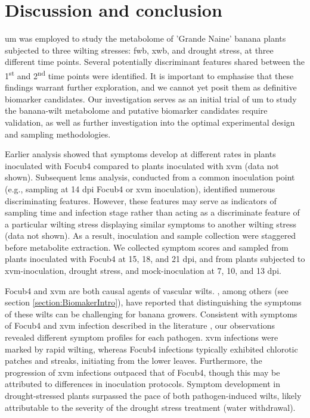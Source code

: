 \newpage
\section{Discussion and conclusion}

\Acf{um} was employed to study the metabolome of 'Grande Naine' banana plants subjected to three wilting stresses: \acf{fwb}, \acf{xwb}, and drought stress, at three different time points. Several potentially discriminant features shared between the 1\textsuperscript{st} and 2\textsuperscript{nd} time points were identified. It is important to emphasise that these findings warrant further exploration, and we cannot yet posit them as definitive biomarker candidates. Our investigation serves as an initial trial of \ac{um} to study the banana-wilt metabolome and putative biomarker candidates require validation, as well as further investigation into the optimal experimental design and sampling methodologies.

Earlier analysis showed that symptoms develop at different rates in plants inoculated with \ac{Focub4} compared to plants inoculated with \ac{xvm} (data not shown). Subsequent \ac{lcms} analysis, conducted from a common inoculation point (e.g., sampling at 14 \ac{dpi} \ac{Focub4} or \ac{xvm} inoculation), identified numerous discriminating features. However, these features may serve as indicators of sampling time and infection stage rather than acting as a discriminate feature of a particular wilting stress displaying similar symptoms to another wilting stress (data not shown). As a result, inoculation and sample collection were staggered before metabolite extraction. We collected symptom scores and sampled from plants inoculated with \ac{Focub4} at 15, 18, and 21 \ac{dpi}, and from plants subjected to \ac{xvm}-inoculation, drought stress, and mock-inoculation at 7, 10, and 13 \ac{dpi}.

\ac{Focub4} and \ac{xvm} are both causal agents of vascular wilts. \textcite{Biruma2007}, among others (see section \ref{section:BiomakerIntro}), have reported that distinguishing the symptoms of these wilts can be challenging for banana growers. Consistent with symptoms of \ac{Focub4} and \ac{xvm} infection described in the literature \parencite{Ploetz2015a, Garcia-Bastidas2019, Ordonez2015a, Ocimati2022, Tripathi2021}, our observations revealed different symptom profiles for each pathogen. \ac{xvm} infections were marked by rapid wilting, whereas \ac{Focub4} infections typically exhibited chlorotic patches and streaks, initiating from the lower leaves. Furthermore, the progression of \ac{xvm} infections outpaced that of \ac{Focub4}, though this may be attributed to differences in inoculation protocols. Symptom development in drought-stressed plants surpassed the pace of both pathogen-induced wilts, likely attributable to the severity of the drought stress treatment (water withdrawal). 

